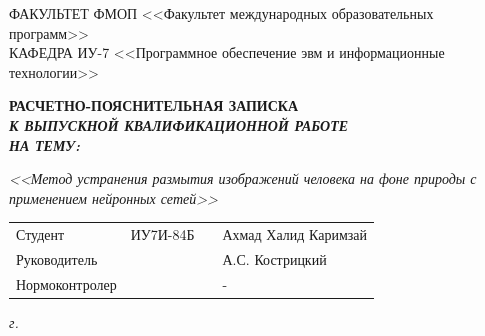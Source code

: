 \begin{titlepage}
	{
		\small \raggedright
		ФАКУЛЬТЕТ ФМОП <<Факультет международных образовательных программ>> \\
		\vspace{3.3mm}
		КАФЕДРА ИУ-7 <<Программное обеспечение эвм и информационные технологии>> \\
	}
	
	\vspace{20.8mm}

	{
		\LARGE \bfseries
		РАСЧЕТНО-ПОЯСНИТЕЛЬНАЯ ЗАПИСКА \\
	}
	\vspace{5mm}
	{
		\Large \bfseries \itshape
		К ВЫПУСКНОЙ КВАЛИФИКАЦИОННОЙ РАБОТЕ \\
		\vspace{5mm}
		НА ТЕМУ: \\
	}
	
	{
		\Large \itshape
		<<Метод устранения размытия изображений человека на фоне природы с применением нейронных сетей>>
	}
	
	\vfill
	
	\begin{tabular}{p{}PPT}
		Студент &  ИУ7И-84Б & \uline{} & Ахмад Халид Каримзай \\
		Руководитель & ~ &  \uline{} & А.С. Кострицкий \\
		Нормоконтролер & ~ &  \uline{} & - \\
	\end{tabular}
	
	\vspace{14mm}
	
	\textit{{\the\year} г.}
	
\end{titlepage}
